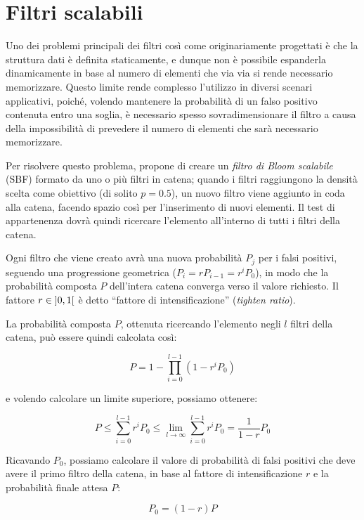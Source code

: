 \section{Filtri scalabili}
\label{sec:bloomscalable}

Uno dei problemi principali dei filtri così come originariamente progettati è che la struttura
dati è definita staticamente, e dunque non è possibile espanderla dinamicamente in base al
numero di elementi che via via si rende necessario memorizzare. Questo limite rende complesso
l'utilizzo in diversi scenari applicativi, poiché, volendo mantenere la probabilità di un falso
positivo contenuta entro una soglia, è necessario spesso sovradimensionare il filtro a causa della 
impossibilità di prevedere il numero di elementi che sarà necessario memorizzare.

Per risolvere questo problema, \cite{bloom-scalable} propone di creare un \emph{filtro di Bloom
scalabile} (SBF) formato da uno o più filtri in catena; quando i filtri raggiungono la densità
scelta come obiettivo (di solito $p=0.5$), un nuovo filtro viene aggiunto in coda alla catena,
facendo spazio così per l'inserimento di nuovi elementi. Il test di appartenenza dovrà quindi
ricercare l'elemento all'interno di tutti i filtri della catena. 

Ogni filtro che viene creato avrà una nuova probabilità $P_j$ per i falsi positivi, seguendo una
progressione geometrica ($P_i = rP_{i-1} = r^iP_0$), in modo che la probabilità composta $P$
dell'intera catena converga verso il valore richiesto. Il fattore $r \in \interval[open]{0}{1}$ è
detto ``fattore di intensificazione'' (\emph{tighten ratio}).

La probabilità composta $P$, ottenuta ricercando l'elemento negli $l$ filtri della catena, può
essere quindi calcolata così:

$$ P = 1 - \prod_{i=0}^{l-1}(1-r^iP_0) $$

e volendo calcolare un limite superiore, possiamo ottenere:

$$ P \leq \sum_{i=0}^{l-1} r^iP_0 \leq \lim_{l \rightarrow \infty} \sum_{i=0}^{l-1} r^iP_0 =
\frac{1}{1-r}P_0 $$

Ricavando $P_0$, possiamo calcolare il valore di probabilità di falsi positivi che deve avere
il primo filtro della catena, in base al fattore di intensificazione $r$ e la probabilità finale
attesa $P$:

\begin{equation} \label{eq:p0fromp}
P_0 = (1-r)P
\end{equation}

